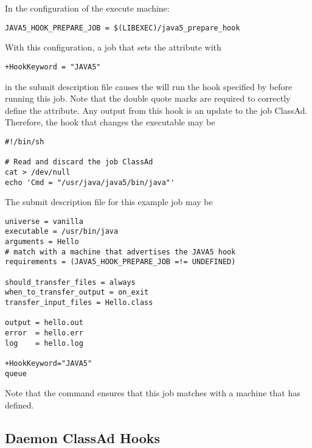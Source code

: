 In the configuration of the execute machine:

\footnotesize
\begin{verbatim}
JAVA5_HOOK_PREPARE_JOB = $(LIBEXEC)/java5_prepare_hook
\end{verbatim}
\normalsize

With this configuration, a job that sets the  attribute with

\begin{verbatim}
+HookKeyword = "JAVA5"
\end{verbatim}

in the submit description file causes the 
will run the hook specified by 
before running this job.
Note that the double quote marks are required to correctly define
the attribute.
Any output from this hook is an update to the job ClassAd.  
Therefore, the hook that changes the executable may be

\begin{verbatim}
#!/bin/sh

# Read and discard the job ClassAd
cat > /dev/null
echo 'Cmd = "/usr/java/java5/bin/java"'
\end{verbatim}

The submit description file for this example job may be
\footnotesize
\begin{verbatim}
universe = vanilla
executable = /usr/bin/java
arguments = Hello
# match with a machine that advertises the JAVA5 hook
requirements = (JAVA5_HOOK_PREPARE_JOB =!= UNDEFINED)

should_transfer_files = always
when_to_transfer_output = on_exit
transfer_input_files = Hello.class

output = hello.out
error  = hello.err
log    = hello.log

+HookKeyword="JAVA5"
queue

\end{verbatim}
\normalsize
Note that the  command ensures that this job
matches with a machine that has  defined.

\subsection{\label{sec:daemon-classad-hooks}
Daemon ClassAd Hooks}
\Todo

